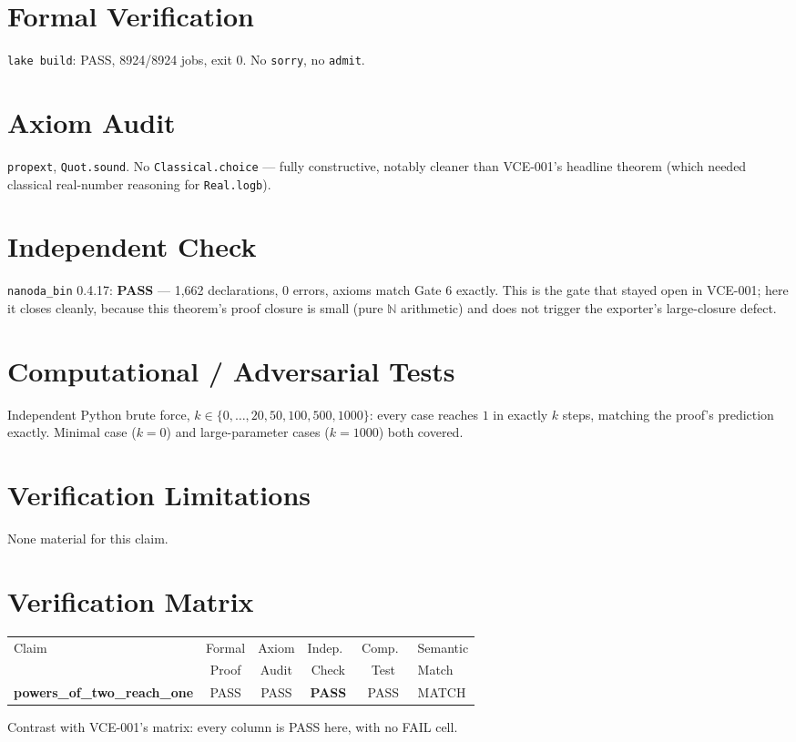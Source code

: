 \documentclass[11pt]{article}
\begin{document}
\section{Formal Verification}
\texttt{lake build}: PASS, 8924/8924 jobs, exit 0. No \texttt{sorry}, no \texttt{admit}.

\section{Axiom Audit}
\texttt{propext}, \texttt{Quot.sound}. No \texttt{Classical.choice} --- fully constructive, notably cleaner than VCE-001's headline theorem (which needed classical real-number reasoning for \texttt{Real.logb}).

\section{Independent Check}
\texttt{nanoda\_bin} 0.4.17: \textbf{PASS} --- 1{,}662 declarations, 0 errors, axioms match Gate 6 exactly. This is the gate that stayed open in VCE-001; here it closes cleanly, because this theorem's proof closure is small (pure $\mathbb{N}$ arithmetic) and does not trigger the exporter's large-closure defect.

\section{Computational / Adversarial Tests}
Independent Python brute force, $k \in \{0,\ldots,20,50,100,500,1000\}$: every case reaches $1$ in exactly $k$ steps, matching the proof's prediction exactly. Minimal case ($k=0$) and large-parameter cases ($k=1000$) both covered.

\section{Verification Limitations}
None material for this claim.

\section{Verification Matrix}
\begin{center}
\small
\begin{tabular}{lccccl}
\toprule
Claim & Formal & Axiom & Indep.\ & Comp.\ & Semantic \\
      & Proof  & Audit & Check   & Test   & Match \\
\midrule
\textbf{powers\_of\_two\_reach\_one} & PASS & PASS & \textbf{PASS} & PASS & MATCH \\
\bottomrule
\end{tabular}
\normalsize
\end{center}
Contrast with VCE-001's matrix: every column is PASS here, with no FAIL cell.
\end{document}
